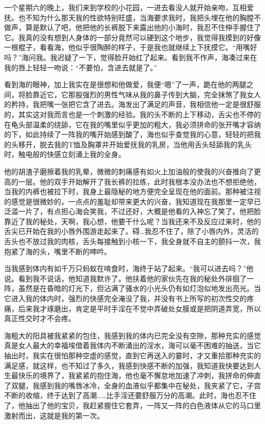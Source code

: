 \documentclass[12pt,UTF8]{ctexbook}
\begin{document}
一个星期六的晚上，我们来到学校的小花园，一进去看没人就开始亲吻，互相爱抚。也不知为什么那天我的性欲特别旺盛，当海要求我时，我把头埋在他的胸膛不做声，算是默认了吧，他把他的长裤脱下来露出他的小海时，我忍不住伸手握住了它。我真的没有想到人身体的一部分竟然可以硬到这个地步，我觉得我摸到的好像一根棍子，看看海，他似乎很陶醉的样子，于是我也就继续上下抚摸它。“用嘴好吗？”海问我。我迟疑了一下，觉得脸开始红了起来。看到我不作声，海凑过来在我的唇上轻轻一吻说：“不要怕，含进去就是了。”

看到海的眼神，加上我实在是很想和他做爱，我便“嗯”了一声，跪在他的两腿之间，将脸靠近它，它那股强烈的男性气味从我的鼻子传到大脑，完全抹煞了我女人的矜持，我把嘴一张把它含了进去。海发出了满足的声音，我相信他一定是很舒服的，其实这对我而言也是一个刺激的经验。我的头不断的上下移动，舌尖也不停的在龟头部温柔的绕舔，它在我的嘴里似乎更加的粗大，我必须拼命的张开嘴才容纳的下，如此持续了一阵我的嘴开始感到酸了，海也似乎查觉我的心意，轻轻的把我的头移开，脱去我的T恤及胸罩并开始爱抚我的乳房，当他用舌头轻舔我的乳头时，触电般的快感立刻涌上我的全身。

他的胡渣子磨擦着我的乳晕，微微的刺痛感有如火上加油般的使我的兴奋推向了更高的一层。他的双手开始解开了我长裤的拉练，此时我根本没办法也不想拒绝他，当我的内裤也被拉下时，我身上最隐秘的地方便完全呈现在他的面前。那种被注视的感觉是很微妙的，一点点的羞耻却带来更大的兴奋，我知道现在我那里一定早已泛滥一片了，有点担心海会笑我，不过还好，大概是他看的入神忘了笑了。他把脸靠近了我的秘处，天啊，我心想，他要干什么呢？当我还来不及反应过来时，他的舌尖已开始在我的小唇外围游走起来了。碍…我忍不住了，除了小唇内外，灵活的舌头也不放过我的肉核，舌头每接触到小核一下，我全身就不自主的颤抖一次，我抱紧了海的头，嘴里不断的呻吟。

当我感到体内有如千万只蚂蚁在啃食时，海终于站了起来。“我可以进去吗？”他说。看到我不说话，他知道我默许了。他扶着他的家伙先在我的秘处外徘徊了一阵，虽然是在昏暗的灯光下，但沾满了骚水的小光头仍有如灯泡似地发出亮光。当它进入我的体内时，强烈的快感完全淹没了我，并没有书上所写的初次性交的疼痛，后来我才琢磨出，肯定是平时手淫在不觉中弄破处女膜或是把阴道弄宽，所以真正性交时才不会疼。

海粗大的阳具被我紧紧的包住，我感到我的体内已完全没有空隙，那种充实的感觉真是女人最大的幸福埃借着我体内不断涌出的淫水，海可以毫不困难的抽送，当它抽出时，我实在很怕那种空虚的感觉，直到它再送入的霎时，才又重拾那种充实的满足感，就这样，也不知过了多久，我感到快感不断的加强，我知道我快要达到人生最快乐的境界了，我紧紧的抱住海，他也毫不懈怠地加速了冲刺，我拼命的伸直了双腿，我感到我的嘴唇冰冷，全身的血液似乎都集中在秘处，我夹紧了它，子宫不断的收缩，终于达到了高潮……比手淫还要舒服万分的高潮。此时，海也忍不住了，他抽出了他的宝贝，我赶紧握住它套弄，一阵又一阵的白色液体从它的马口里激射而出，这就是我的第一次。
\end{document}
